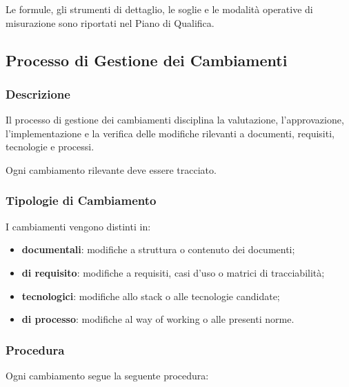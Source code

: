 Le formule, gli strumenti di dettaglio, le soglie e le modalità operative di
misurazione sono riportati nel Piano di Qualifica.


\subsection{Processo di Gestione dei Cambiamenti}
\label{sec:cambiamenti}

\subsubsection{Descrizione}

Il processo di gestione dei cambiamenti disciplina la valutazione, l'approvazione,
l'implementazione e la verifica delle modifiche rilevanti a documenti, requisiti,
tecnologie e processi.

Ogni cambiamento rilevante deve essere tracciato.


\subsubsection{Tipologie di Cambiamento}

I cambiamenti vengono distinti in:

\begin{itemize}
    \item \textbf{documentali}: modifiche a struttura o contenuto dei documenti;
    \item \textbf{di requisito}: modifiche a requisiti, casi d'uso o matrici di tracciabilità;
    \item \textbf{tecnologici}: modifiche allo stack o alle tecnologie candidate;
    \item \textbf{di processo}: modifiche al way of working o alle presenti norme.
\end{itemize}


\subsubsection{Procedura}

Ogni cambiamento segue la seguente procedura:

